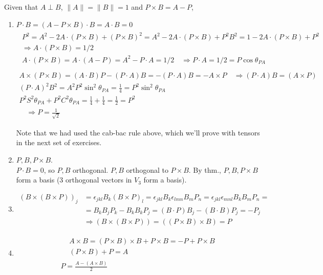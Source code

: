 \documentclass[twoside]{amsart}
\theoremstyle{plain}
\theoremstyle{definition}
\newcommand{\exercisehead}[1]
  {\smallskip
   \noindent{\small\bf Exercise #1.}}
\begin{document}
\exercisehead{15} Given that $A \perp B$, $\| A \| = \| B \| = 1$ and $P \times B = A - P$,
\begin{enumerate}
\item $P \cdot B = (A - P\times B) \cdot B = A\cdot B =0$ \\

\[
\begin{gathered}
  \begin{gathered}
    P^2 = A^2 - 2A \cdot (P\times B) + (P \times B)^2  = A^2  - 2A \cdot ( P \times B ) + P^2 B^2 = 1 - 2A \cdot (P\times B) + P^2  \\
    \Longrightarrow A \cdot ( P \times B) = 1/2 \\
    A \cdot (P\times B) = A \cdot ( A - P) = A^2 - P\cdot A = 1/2 \quad \Longrightarrow P \cdot A = 1/2 = P \cos{ \theta_{PA} }
  \end{gathered} \\
\quad \\
A \times (P \times B) = (A\cdot B)  P - (P\cdot A)B = -(P\cdot A) B = -A \times P \quad \Longrightarrow (P\cdot A) B = (A \times P) \\
(P\cdot A)^2 B^2 = A^2 P^2 \sin^2{\theta_{PA} } = \frac{1}{4} = P^2 \sin^2{ \theta_{PA}} \\
P^2 S^2{ \theta_{PA}} + P^2 C^2{ \theta_{PA}} = \frac{1}{4} + \frac{1}{4} = \frac{1}{2} = P^2 \\ 
\quad \Longrightarrow \boxed{ P = \frac{1}{\sqrt{2}} }
\end{gathered}
\]

Note that we had used the cab-bac rule above, which we'll prove with tensors in the next set of exercises.  
\item $P,B,P\times B$.  \\
  $P\cdot B = 0$, so $P,B$ orthogonal.  $P,B$ orthogonal to $P\times B$.  By thm., $P,B,P\times B$ form a basis (3 orthogonal vectors in $V_3$ form a basis).  
\item 
\[
\begin{aligned}
  ( B \times (B \times P))_j & = \epsilon_{jkl} B_k (B\times P)_l = \epsilon_{jkl} B_k \epsilon_{lmn} B_m P_n = \epsilon_{jkl}\epsilon_{mnl} B_k B_m P_n = \\
  & = B_k B_j P_k - B_k B_k P_j = (B\cdot P) B_j - (B\cdot B) P_j = -P_j \\
  & \Longrightarrow \boxed{ (B\times (B\times P)) = ((P\times B) \times B) = P }
\end{aligned}
\]
\item \[
\begin{gathered}
  \begin{aligned}
    & A \times B = (P \times B) \times B + P \times B = -P + P \times B \\
    & (P \times B) + P = A 
  \end{aligned} \\
P = \frac{ A - (A \times B)}{ 2 } 
\end{gathered}
\]
\end{enumerate}
\end{document}
